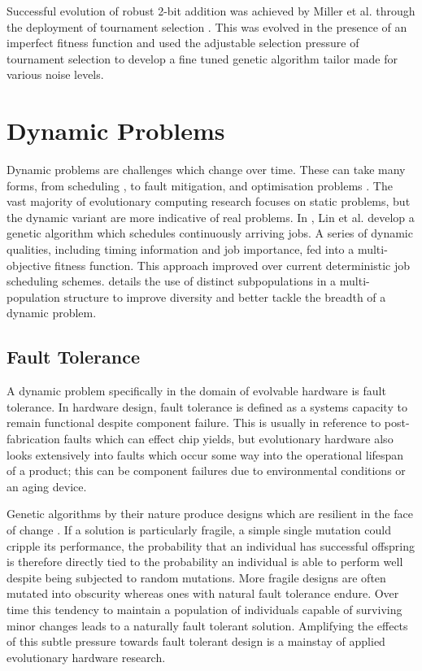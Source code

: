 Successful evolution of robust 2-bit addition was achieved by Miller et al. through
the deployment of tournament selection \cite{TournamentAdder}. This was evolved
in the presence of an imperfect fitness function and used the adjustable selection
pressure of tournament selection to develop a fine tuned genetic algorithm tailor
made for various noise levels.

\section{Dynamic Problems}

Dynamic problems are challenges which change over time. These can take many
forms, from scheduling \cite{LIN1997AGA}, to fault mitigation, and optimisation problems
\cite{Branke2003}. The vast majority of evolutionary computing research focuses on
static problems, but the dynamic variant are more indicative of real problems.
In \cite{LIN1997AGA}, Lin et al. develop a genetic algorithm
which schedules continuously arriving jobs. A series of dynamic qualities, including
timing information and job importance, fed into a multi-objective fitness function. This
approach improved over current deterministic job scheduling schemes. \cite{Branke2003}
details the use of distinct subpopulations in a multi-population structure to
improve diversity and better tackle the breadth of a dynamic problem.

\subsection{Fault Tolerance}

A dynamic problem specifically in the domain of evolvable hardware is fault
tolerance.
In hardware design, fault tolerance is defined as a systems capacity to
remain functional despite component failure. This is usually in reference to
post-fabrication faults which can effect chip yields, but evolutionary
hardware also looks extensively into faults which occur some way into the
operational lifespan of a product; this can be component failures due to environmental
conditions or an aging device.

Genetic algorithms by their nature produce designs which are resilient in the face
of change \cite{10.1007/3-540-46406-9_14}\cite{651463}. If a solution is particularly fragile, a
simple single mutation could cripple its performance, the probability that an individual
has successful offspring is therefore directly tied to the probability an individual is
able to perform well
despite being subjected to random mutations. More fragile designs are often
mutated into obscurity whereas ones with
natural fault tolerance endure. Over time this tendency to maintain a population
of individuals capable of surviving minor changes leads to a naturally fault tolerant
solution.
Amplifying the effects of this subtle pressure towards fault
tolerant design is a mainstay of applied evolutionary hardware research.

